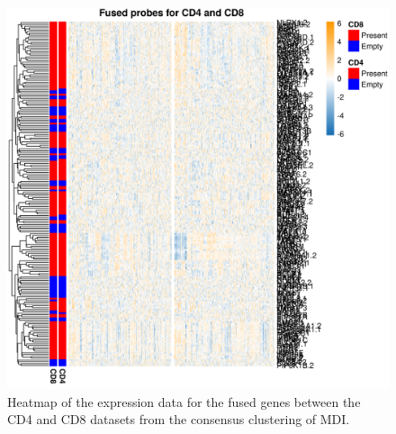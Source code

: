 \documentclass[12pt]{article} %
\begin{document}
	\newpage
	
	\begin{figure}[h]
		\centering
		\includegraphics[scale=0.75]{Images/Biology_data/All_datasets/Fusion_expression_data/heatmap_fused_genes_CD4_CD8.png}
		\caption{Heatmap of the expression data for the fused genes between the CD4 and CD8 datasets from the consensus clustering of MDI.}
		\label{fig:mdi_cd4_cd8_fused_genes}
	\end{figure}

	\newpage
\end{document}
